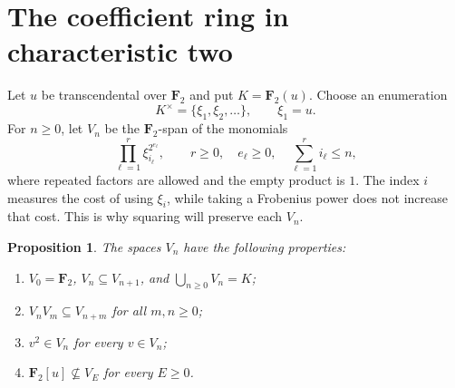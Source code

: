 \documentclass[11pt,reqno]{amsart}
\numberwithin{equation}{section}
\theoremstyle{plain}
\newtheorem{proposition}[theorem]{Proposition}
\theoremstyle{definition}
\theoremstyle{remark}
\newcommand{\F}{\mathbf F}
\begin{document}
\section{The coefficient ring in characteristic two}
\label{sec:char2}

Let $u$ be transcendental over $\F_2$ and put $K=\F_2(u)$.  Choose an
enumeration
\[
  K^\times=\{\xi_1,\xi_2,\ldots\},\qquad \xi_1=u.
\]
For $n\geq0$, let $V_n$ be the $\F_2$-span of the monomials
\begin{equation}\label{eq:Vn-char2}
  \prod_{\ell=1}^r \xi_{i_\ell}^{2^{e_\ell}},
  \qquad r\geq0,\quad e_\ell\geq0,\quad
  \sum_{\ell=1}^r i_\ell\leq n,
\end{equation}
where repeated factors are allowed and the empty product is $1$.  The index
$i$ measures the cost of using $\xi_i$, while taking a Frobenius power does
not increase that cost.  This is why squaring will preserve each $V_n$.

\begin{proposition}\label{prop:V-properties}
The spaces $V_n$ have the following properties:
\begin{enumerate}[label=\textup{(\alph*)}]
\item $V_0=\F_2$, $V_n\subseteq V_{n+1}$, and
      $\bigcup_{n\geq0}V_n=K$;
\item $V_nV_m\subseteq V_{n+m}$ for all $m,n\geq0$;
\item $v^2\in V_n$ for every $v\in V_n$;
\item $\F_2[u]\nsubseteq V_E$ for every $E\geq0$.
\end{enumerate}
\end{proposition}
\end{document}
